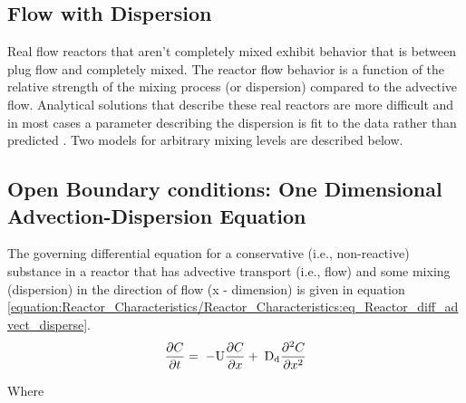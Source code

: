 \documentclass[letterpaper,10pt,english]{sphinxmanual}
\begin{document}
\subsection{Flow with Dispersion}
\label{\detokenize{Reactor_Characteristics/Reactor_Characteristics:flow-with-dispersion}}
Real flow reactors that aren’t completely mixed exhibit behavior that is between plug flow and completely mixed. The reactor flow behavior is a function of the relative strength of the mixing process (or dispersion) compared to the advective flow. Analytical solutions that describe these real reactors are more difficult and in most cases a parameter describing the dispersion is fit to the data rather than predicted . Two models for arbitrary mixing levels are described below.


\subsection{Open Boundary conditions: One Dimensional Advection-Dispersion Equation}
\label{\detokenize{Reactor_Characteristics/Reactor_Characteristics:open-boundary-conditions-one-dimensional-advection-dispersion-equation}}
The governing differential equation for a conservative (i.e., non-reactive) substance in a reactor that has advective transport (i.e., flow) and some mixing (dispersion) in the direction of flow (x - dimension) is given in equation \eqref{equation:Reactor_Characteristics/Reactor_Characteristics:eq_Reactor_diff_advect_disperse}.
\begin{equation}\label{equation:Reactor_Characteristics/Reactor_Characteristics:eq_Reactor_diff_advect_disperse}
\begin{split} \frac{\partial C}{\partial t} ={\rm \; -U}\frac{\partial C}{\partial x} +{\rm \; D}_{{\rm d}} \frac{\partial ^{2} C}{\partial x^{2}}\end{split}
\end{equation}\begin{description}
\item[{Where}] \leavevmode
{}

\end{description}
\end{document}
